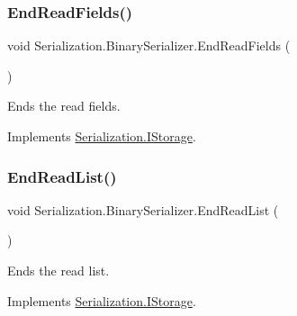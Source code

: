 \subsubsection{\texorpdfstring{End\+Read\+Fields()}{EndReadFields()}}
{\footnotesize\ttfamily void Serialization.\+Binary\+Serializer.\+End\+Read\+Fields (\begin{DoxyParamCaption}{ }\end{DoxyParamCaption})\hspace{0.3cm}{\ttfamily [inline]}}



Ends the read fields. 



Implements \hyperlink{interface_serialization_1_1_i_storage_af38f83f1eb0c5190fd0e4ad845ff0649}{Serialization.\+I\+Storage}.

\mbox{\label{class_serialization_1_1_binary_serializer_aa4cb3eb6253054c5fe8bbebdc9c30c2f}} 
\subsubsection{\texorpdfstring{End\+Read\+List()}{EndReadList()}}
{\footnotesize\ttfamily void Serialization.\+Binary\+Serializer.\+End\+Read\+List (\begin{DoxyParamCaption}{ }\end{DoxyParamCaption})\hspace{0.3cm}{\ttfamily [inline]}}



Ends the read list. 



Implements \hyperlink{interface_serialization_1_1_i_storage_a2349911c359017baa76773f203b33ee5}{Serialization.\+I\+Storage}.

\mbox{\label{class_serialization_1_1_binary_serializer_af0b58fefbd4bea88a09cffc7bdcef862}} 
